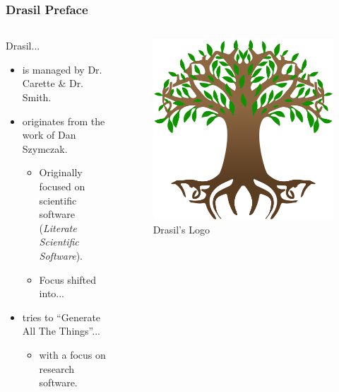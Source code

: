 \documentclass{beamer}
\begin{document}
\begin{frame}
    \frametitle{Drasil Preface}
    \begin{columns}[T,onlytextwidth]
        \begin{column}{.5\textwidth}
            Drasil...
            \newline \newline
            \begin{minipage}{\textwidth}
                \begin{itemize}
                    \item<1-> is managed by Dr. Carette \& Dr. Smith.
                    \item<2-> originates from the work of Dan Szymczak.
                        \begin{itemize}
                            \item<3-> Originally focused on scientific software (\emph{Literate Scientific Software}).
                            \item<4-> Focus shifted into...
                        \end{itemize}
                    \item<5-> tries to ``Generate All The Things''...
                    \begin{itemize}
                        \item<6-> with a focus on research software.
                    \end{itemize}
                \end{itemize}
            \end{minipage}
        \end{column}
        \begin{column}{.45\textwidth}
            \begin{figure}
                \includegraphics[width=.8\textwidth]{assets/drasil-logo.png}
                \caption{Drasil's Logo \tiny\cite{Drasil2021}\cite{YggdrasilWiki2021}} %
            \end{figure}
        \end{column}
    \end{columns}
\end{frame}
\end{document}

